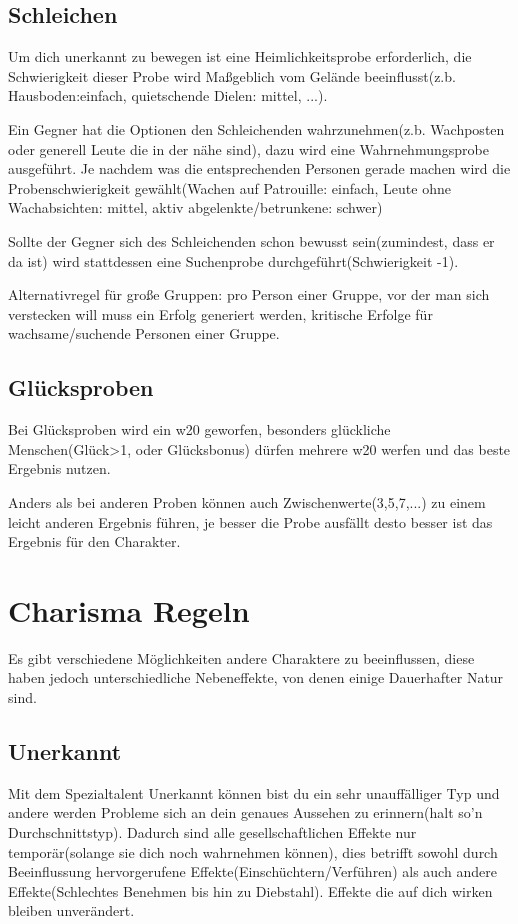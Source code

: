 \section{Schleichen}
Um dich unerkannt zu bewegen ist eine Heimlichkeitsprobe erforderlich, die Schwierigkeit dieser Probe wird Maßgeblich vom Gelände beeinflusst(z.b. Hausboden:einfach, quietschende Dielen: mittel, ...).

Ein Gegner hat die Optionen den Schleichenden wahrzunehmen(z.b. Wachposten oder generell Leute die in der nähe sind), dazu wird eine Wahrnehmungsprobe ausgeführt. Je nachdem was die entsprechenden Personen gerade machen wird die Probenschwierigkeit gewählt(Wachen auf Patrouille: einfach, Leute ohne Wachabsichten: mittel, aktiv abgelenkte/betrunkene: schwer)

Sollte der Gegner sich des Schleichenden schon bewusst sein(zumindest, dass er da ist) wird stattdessen eine Suchenprobe durchgeführt(Schwierigkeit -1).

Alternativregel für große Gruppen: pro Person einer Gruppe, vor der man sich verstecken will muss ein Erfolg generiert werden, kritische Erfolge für wachsame/suchende Personen einer Gruppe.

\section{Glücksproben}
Bei Glücksproben wird ein w20 geworfen, besonders glückliche Menschen(Glück>1, oder Glücksbonus) dürfen mehrere w20 werfen und das beste Ergebnis nutzen.

Anders als bei anderen Proben können auch Zwischenwerte(3,5,7,...) zu einem leicht anderen Ergebnis führen, je besser die Probe ausfällt desto besser ist das Ergebnis für den Charakter.
\chapter{Charisma Regeln}

Es gibt verschiedene Möglichkeiten andere Charaktere zu beeinflussen, diese haben jedoch unterschiedliche Nebeneffekte, von denen einige Dauerhafter Natur sind.

\section{Unerkannt}
\label{Unerkannt}
Mit dem Spezialtalent Unerkannt können bist du ein sehr unauffälliger Typ und andere werden Probleme sich an dein genaues Aussehen zu erinnern(halt so'n Durchschnittstyp). Dadurch sind alle gesellschaftlichen Effekte nur temporär(solange sie dich noch wahrnehmen können), dies betrifft sowohl durch Beeinflussung hervorgerufene Effekte(Einschüchtern/Verführen) als auch andere Effekte(Schlechtes Benehmen bis hin zu Diebstahl). Effekte die auf dich wirken bleiben unverändert.

